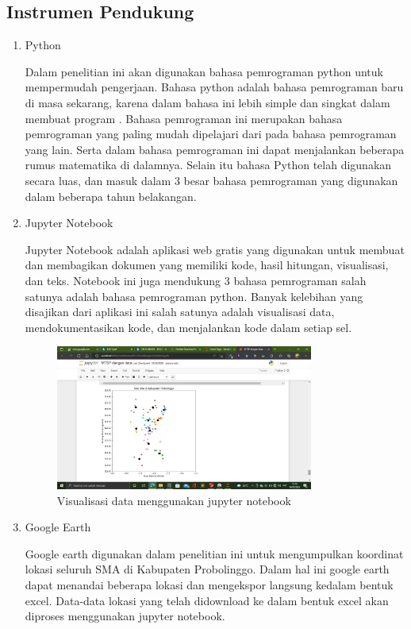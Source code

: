 \subsection{Instrumen Pendukung}
\begin{enumerate}
    \item Python
    
    Dalam penelitian ini akan digunakan bahasa pemrograman python untuk mempermudah pengerjaan. Bahasa python adalah bahasa pemrograman baru di masa sekarang, karena dalam bahasa ini lebih simple dan singkat dalam membuat program \cite{syahrudin2018input}. Bahasa pemrograman ini merupakan bahasa pemrograman yang paling mudah dipelajari dari pada bahasa pemrograman yang lain. Serta dalam bahasa pemrograman ini dapat menjalankan beberapa rumus matematika di dalamnya. Selain itu bahasa Python telah digunakan secara luas, dan masuk dalam 3 besar bahasa pemrograman yang digunakan dalam beberapa tahun belakangan.
    
    \item Jupyter Notebook
    
    Jupyter Notebook adalah aplikasi web gratis yang digunakan untuk membuat dan membagikan dokumen yang memiliki kode, hasil hitungan, visualisasi, dan teks. Notebook ini juga mendukung 3 bahasa pemrograman salah satunya adalah bahasa pemrograman python. Banyak kelebihan yang disajikan dari aplikasi ini salah satunya adalah visualisasi data, mendokumentasikan kode, dan menjalankan kode dalam setiap sel.

\begin{figure}[h!]
  \centering
  \includegraphics[width=0.8\textwidth]{visualisasi jupyter.png}
  \caption{Visualisasi data menggunakan jupyter notebook}
\end{figure}

	\item Google Earth
	
	Google earth digunakan dalam penelitian ini untuk mengumpulkan koordinat lokasi seluruh SMA di Kabupaten Probolinggo. Dalam hal ini google earth dapat menandai beberapa lokasi dan mengekspor langsung kedalam bentuk excel. Data-data lokasi yang telah didownload ke dalam bentuk excel akan diproses menggunakan jupyter notebook.


\end{enumerate}
